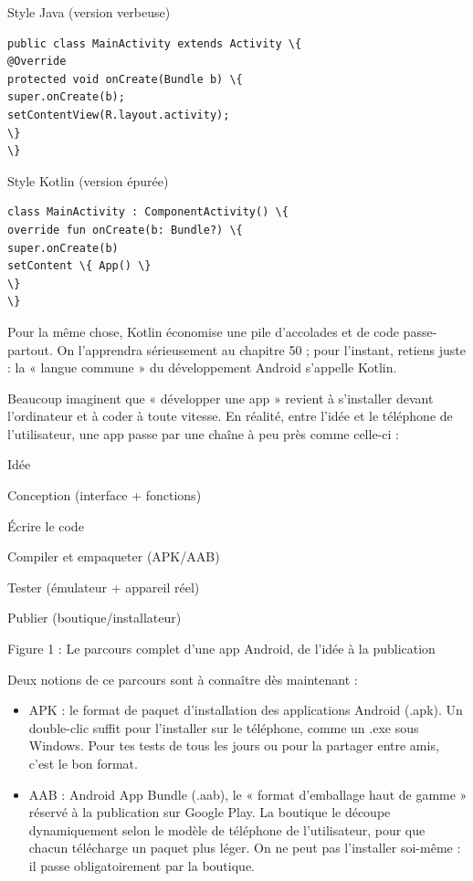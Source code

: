 Style Java (version verbeuse)

\begin{lstlisting}
public class MainActivity extends Activity \{
@Override
protected void onCreate(Bundle b) \{
super.onCreate(b);
setContentView(R.layout.activity);
\}
\}
\end{lstlisting}

Style Kotlin (version épurée)

\begin{lstlisting}
class MainActivity : ComponentActivity() \{
override fun onCreate(b: Bundle?) \{
super.onCreate(b)
setContent \{ App() \}
\}
\}
\end{lstlisting}

Pour la même chose, Kotlin économise une pile d'accolades et de code passe-partout. On l'apprendra sérieusement au chapitre 50 ; pour l'instant, retiens juste : la « langue commune » du développement Android s'appelle Kotlin.


Beaucoup imaginent que « développer une app » revient à s'installer devant l'ordinateur et à coder à toute vitesse. En réalité, entre l'idée et le téléphone de l'utilisateur, une app passe par une chaîne à peu près comme celle-ci :

Idée

Conception (interface + fonctions)

Écrire le code

Compiler et empaqueter (APK/AAB)

Tester (émulateur + appareil réel)

Publier (boutique/installateur)

\begin{center}\small\color{gray}Figure 1 : Le parcours complet d'une app Android, de l'idée à la publication\end{center}

Deux notions de ce parcours sont à connaître dès maintenant :

\begin{itemize}
  \item APK : le format de paquet d'installation des applications Android (.apk). Un double-clic suffit pour l'installer sur le téléphone, comme un .exe sous Windows. Pour tes tests de tous les jours ou pour la partager entre amis, c'est le bon format.
  \item AAB : Android App Bundle (.aab), le « format d'emballage haut de gamme » réservé à la publication sur Google Play. La boutique le découpe dynamiquement selon le modèle de téléphone de l'utilisateur, pour que chacun télécharge un paquet plus léger. On ne peut pas l'installer soi-même : il passe obligatoirement par la boutique.
\end{itemize}

